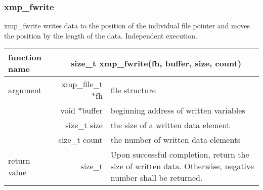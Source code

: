    \subsubsection{xmp\_fwrite}
   xmp\_fwrite writes data to the position of the individual file
   pointer and moves the position by the length of the data.
   Independent execution.

   \begin{table}[h]
    \begin{center}
     \begin{tabular}{|l|r|p{80mm}|}
      \hline
      {\bf function name}  & \multicolumn{2}{c|}{\bf size\_t
      xmp\_fwrite(fh, buffer, size, count)} \\ \hline \hline
      argument & xmp\_file\_t $*$fh & file structure \\ \cline{2-3}
      & void $*$buffer & beginning address of written variables \\ \cline{2-3}
      & size\_t size & the size of a written data element \\ \cline{2-3}
      & size\_t count & the number of written data elements \\ \hline
      return value & size\_t & Upon successful completion, return the size
	      of written data. Otherwise, negative number shall be
	      returned. \\ \hline
      \end{tabular}
     \end{center}
    \label{tb:aaa}
   \end{table}

   
